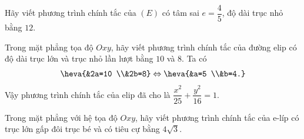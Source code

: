 \begin{bt}%
	Hãy viết phương trình chính tắc của $(E)$ có tâm sai $e=\dfrac{4}{5}$, độ dài trục nhỏ bằng $12$.
\end{bt}

\begin{bt}%
	Trong mặt phẳng tọa độ $Oxy$, hãy viết phương trình chính tắc của đường elip có độ dài trục lớn và trục nhỏ lần lượt bằng $10$ và $8$.
	\loigiai
	{
		Ta có
		\[\heva{&2a=10 \\&2b=8} \Leftrightarrow \heva{&a=5 \\&b=4.}\]
		Vậy phương trình chính tắc của elip đã cho là $\dfrac{x^2}{25}+\dfrac{y^2}{16}=1$.
	}
\end{bt}

\begin{bt}%
	Trong mặt phẳng với hệ tọa độ $Oxy$, hãy viết phương trình chính tắc của e-líp có trục lớn gấp đôi trục bé và có tiêu cự bằng $4\sqrt{3}$.
\end{bt}

